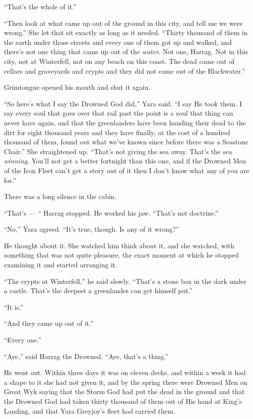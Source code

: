 “That’s the whole of it.”

“Then look at what came up out of the ground in this city, and tell me we were wrong.” She let that sit exactly as long as it needed. “Thirty thousand of them in the earth under those streets and every one of them got up and walked, and there’s not one thing that came up out of the \textit{water}. Not one, Harrag. Not in this city, not at Winterfell, not on any beach on this coast. The dead came out of cellars and graveyards and crypts and they did not come out of the Blackwater.”

Grimtongue opened his mouth and shut it again.

“So here’s what I say the Drowned God did,” Yara said. “I say He took them. I say every soul that goes over that rail past the point is a soul that thing can never have again, and that the greenlanders have been handing their dead to the dirt for eight thousand years and they have finally, at the cost of a hundred thousand of them, found out what we’ve known since before there was a Seastone Chair.” She straightened up. “That’s not giving the sea away. That’s the sea \textit{winning}. You’ll not get a better fortnight than this one, and if the Drowned Men of the Iron Fleet can’t get a story out of it then I don’t know what any of you are for.”

There was a long silence in the cabin.

“That’s — “ Harrag stopped. He worked his jaw. “That’s not doctrine.”

“No,” Yara agreed. “It’s true, though. Is any of it wrong?”

He thought about it. She watched him think about it, and she watched, with something that was not quite pleasure, the exact moment at which he stopped examining it and started arranging it.

“The crypts at Winterfell,” he said slowly. “That’s a stone box in the dark under a castle. That’s the deepest a greenlander can get himself put.”

“It is.”

“And they came up out of it.”

“Every one.”

“Aye,” said Harrag the Drowned. “Aye, that’s a thing.”

He went out. Within three days it was on eleven decks, and within a week it had a shape to it she had not given it, and by the spring there were Drowned Men on Great Wyk saying that the Storm God had put the dead in the ground and that the Drowned God had taken thirty thousand of them out of His hand at King’s Landing, and that Yara Greyjoy’s fleet had carried them.

